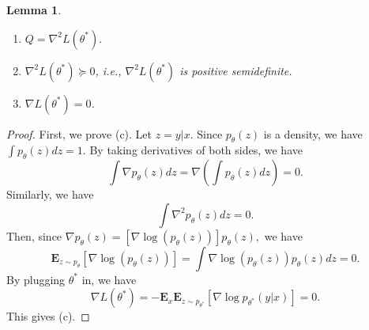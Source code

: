 \documentclass[11pt,letterpaper]{article}
\newcommand{\expt}{\mathbf{E}}
\newtheorem{lemma}{Lemma}
\theoremstyle{definition}
\begin{document}
\begin{lemma}
\label{lemma2} 
\begin{enumerate}
	\item [(a)] $Q=\nabla ^{2}L(\theta ^{\ast }).$
	\item [(b)] $\nabla ^{2}L(\theta ^{\ast })\succeq 0$, i.e., $\nabla
^{2}L(\theta ^{\ast })$ is positive semidefinite.
	\item [(c)] $\nabla L(\theta ^{\ast })=0$.
\end{enumerate}
\end{lemma}
\begin{proof}
	First, we prove (c). Let $z=y|x.$ Since $p_{\theta }(z)$ is a density,
we have $\int p_{\theta }(z)dz=1.$ By taking derivatives of both sides, we
have%
\begin{equation*}
\int \nabla p_{\theta }(z)dz=\nabla \left(\int p_{\theta }(z)dz \right)=0.
\end{equation*}%
Similarly, we have%
\begin{equation}
\int \nabla ^{2}p_{\theta }(z)dz=0.  \label{delta2}
\end{equation}%
Then, since $\nabla p_{\theta }(z)=[\nabla \log (p_{\theta }(z))]p_{\theta
}(z),$ we have%
\begin{equation*}
\expt_{z\sim p_{\theta }}[\nabla \log (p_{\theta }(z))]=\int \nabla \log
(p_{\theta }(z))p_{\theta }(z) dz=0.
\end{equation*}%
By plugging $\theta ^{\ast }$ in, we have
\begin{equation*}
\nabla L(\theta ^{\ast })=-\expt_x\expt_{z\sim p_{\theta^*}}[\nabla \log p_{\theta ^{\ast }}(y|x)]=0.
\end{equation*}
This gives (c).


\end{proof}
\end{document}
